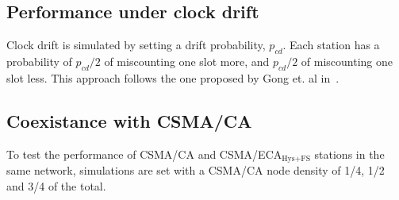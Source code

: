 	\subsection{Performance under clock drift}
	Clock drift is simulated by setting a drift probability, $p_{cd}$. Each station has a probability of $p_{cd}/2$ of miscounting one slot more, and $p_{cd}/2$ of miscounting one slot less. This approach follows the one proposed by Gong et. al in~\cite{slotDrift}.
	
	\subsection{Coexistance with CSMA/CA}\label{coexistence}
	To test the performance of CSMA/CA and CSMA/ECA$_{\text{Hys+FS}}$ stations in the same network, simulations are set with a CSMA/CA node density of 1/4, 1/2 and 3/4 of the total.
